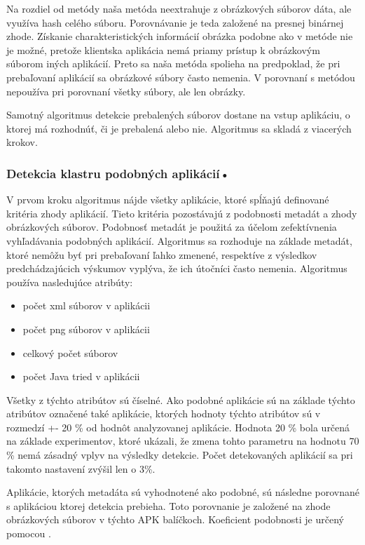 Na rozdiel od metódy  naša metóda neextrahuje z obrázkových súborov dáta, ale využíva hash celého súboru. Porovnávanie je teda založené na presnej binárnej zhode. Získanie charakteristických informácií obrázka podobne ako v metóde  nie je možné, pretože klientska aplikácia nemá priamy prístup k obrázkovým súborom iných aplikácií. Preto sa naša metóda spolieha na predpoklad, že pri prebaľovaní aplikácií sa obrázkové súbory často nemenia. 
V porovnaní s metódou  nepoužíva  pri porovnaní všetky súbory, ale len  obrázky.

Samotný algoritmus detekcie prebalených súborov dostane na vstup aplikáciu, o ktorej má rozhodnúť, či je prebalená alebo nie. Algoritmus sa skladá z viacerých krokov.

\subsubsection{\textbf{Detekcia klastru podobných aplikácií}•} 

V prvom kroku algoritmus nájde všetky aplikácie, ktoré spĺňajú definované kritéria zhody aplikácií. Tieto kritéria pozostávajú z podobnosti metadát a zhody obrázkových súborov. 
Podobnosť metadát je použitá za účelom zefektívnenia vyhľadávania podobných aplikácií. Algoritmus sa rozhoduje na základe metadát, ktoré nemôžu byť pri prebaľovaní ľahko zmenené, respektíve z výsledkov predchádzajúcich výskumov vyplýva, že ich útočníci často nemenia. \newline \noindent Algoritmus používa nasledujúce atribúty:
\begin{itemize}
	\item počet xml súborov v aplikácii
	\item počet png súborov v aplikácii
	\item celkový počet súborov
	\item počet Java tried v aplikácii
\end{itemize}

Všetky z týchto atribútov sú číselné. Ako podobné aplikácie sú na základe týchto atribútov označené také aplikácie, ktorých hodnoty týchto atribútov sú v rozmedzí +- 20 \% od hodnôt analyzovanej aplikácie. Hodnota 20 \% bola určená na základe experimentov, ktoré ukázali, že zmena tohto parametru na hodnotu 70 \% nemá zásadný vplyv na výsledky detekcie. Počet detekovaných aplikácií sa pri takomto nastavení zvýšil len o 3\%. 

Aplikácie, ktorých metadáta sú vyhodnotené ako podobné, sú následne porovnané s aplikáciou ktorej detekcia prebieha. Toto porovnanie je založené na zhode obrázkových  súborov v týchto APK balíčkoch.  Koeficient podobnosti je určený pomocou .


